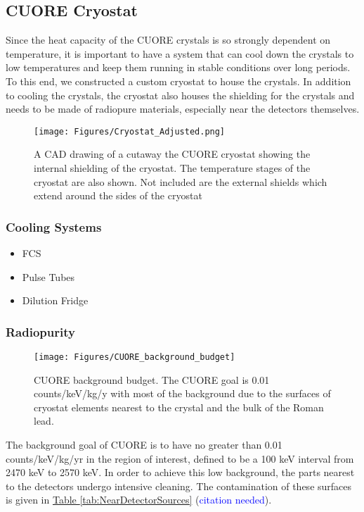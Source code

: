 \documentclass[12pt,a4paper]{article}
\begin{document}
\subsection{CUORE Cryostat}

Since the heat capacity of the CUORE crystals is so strongly dependent on temperature, it is important to have a system that can cool down the crystals to low temperatures and keep them running in stable conditions over long periods. To this end, we constructed a custom cryostat to house the crystals. In addition to cooling the crystals, the cryostat also houses the shielding for the crystals and needs to be made of radiopure materials, especially near the detectors themselves.

\begin{figure}[htbp]
\centering
\texttt{[image: Figures/Cryostat\_Adjusted.png]}
\caption{A CAD drawing of a cutaway the CUORE cryostat showing the internal shielding of the cryostat. The temperature stages of the cryostat are also shown. Not included are the external shields which extend around the sides of the cryostat}
\label{fig:cryostat_cad_cutout}
\end{figure}


\subsubsection*{Cooling Systems}
\begin{itemize}
\item FCS
\item Pulse Tubes
\item Dilution Fridge


\end{itemize}

\subsubsection*{Radiopurity}

\begin{figure}[htbp]
\centering
\texttt{[image: Figures/CUORE\_background\_budget]}
\caption{CUORE background budget. The CUORE goal is 0.01 counts/keV/kg/y with most of the background due to the surfaces of cryostat elements nearest to the crystal and the bulk of the Roman lead.}
\label{fig:istogramma}
\end{figure}

The background goal of CUORE is to have no greater than 0.01 counts/keV/kg/yr in the region of interest, defined to be a 100 keV interval from 2470 keV to 2570 keV. In order to achieve this low background, the parts nearest to the detectors undergo intensive cleaning. The contamination of these surfaces is given in \hyperref[tab:NearDetectorSources]{Table \ref*{tab:NearDetectorSources}} (\textcolor{blue}{citation needed}).
\end{document}
